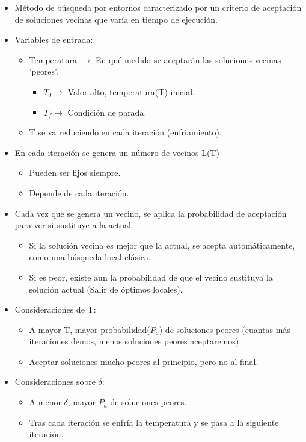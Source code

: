 \documentclass{llncs}
\begin{document}
\begin{itemize}
\item M\'{e}todo de b\'{u}squeda por entornos caracterizado por un criterio de aceptaci\'{o}n de soluciones vecinas que var\'{i}a en tiempo de ejecuci\'{o}n.
\item Variables de entrada:
\begin{itemize}
\item Temperatura $\rightarrow$ En qu\'{e} medida se aceptar\'{a}n las soluciones vecinas 'peores'.
\begin{itemize}
\item $T_0 \rightarrow$ Valor alto, temperatura(T) inicial.
\item $T_f \rightarrow$ Condici\'{o}n de parada.
\end{itemize}
\item T se va reduciendo en cada iteraci\'{o}n (enfriamiento).
\end{itemize}
\item En cada iteraci\'{o}n se genera un n\'{u}mero de vecinos L(T)
\begin{itemize}
\item Pueden ser fijos siempre.
\item Depende de cada iteraci\'{o}n.
\end{itemize}
\item Cada vez que se genera un vecino, se aplica la probabilidad de aceptaci\'{o}n para ver si sustituye a la actual.
\begin{itemize}
\item Si la soluci\'{o}n vecina es mejor que la actual, se acepta autom\'{a}ticamente, como una b\'{u}squeda local cl\'{a}sica.
\item Si es peor, existe aun la probabilidad de que el vecino sustituya la soluci\'{o}n actual (Salir de \'{o}ptimos locales).
\end{itemize}
\end{itemize}

\begin{itemize}
\item Consideraciones de T:
\begin{itemize}
\item A mayor T, mayor probabilidad($P_a$) de soluciones peores (cuantas m\'{a}s iteraciones demos, menos soluciones peores aceptaremos).
\item Aceptar soluciones mucho peores al principio, pero no al final.
\end{itemize}
\item Consideraciones sobre $\delta$:
\begin{itemize}
\item A menor $\delta$, mayor $P_a$ de soluciones peores.
\item Tras cada iteraci\'{o}n se enfr\'{i}a la temperatura y se pasa a la siguiente iteraci\'{o}n.
\end{itemize}
\end{itemize}
\end{document}
